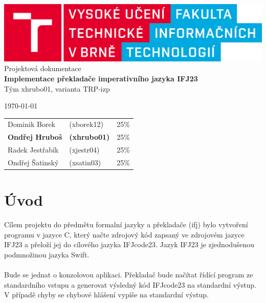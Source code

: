 \documentclass[12pt]{article}
\begin{document}
    \begin{titlepage}
        \begin{center}
            \includegraphics[width=0.77\linewidth]{img/fit_logo.png} \\
            \Huge{Projektová dokumentace} \\
            \Large{\textbf{Implementace překladače imperativního jazyka IFJ23}} \\
            \Large{Tým xhrubo01, varianta TRP-izp} \\ 
        \end{center}
        \begin{minipage}{0.4 \textwidth}
			{\Large \today}
		\end{minipage}
		\hfill
		\begin{minipage}[r]{0.6 \textwidth}
			\normalsize
            \begin{flushright}
                \begin{tabular}{l l l}
    				Dominik Borek & (xborek12) & 25\%\\
    				\textbf{Ondřej Hruboš} & \textbf{(xhrubo01)} & 25\%\\
    				Radek Jestřabík & (xjestr04)  & 25\%\\
    				Ondřej Šatinský & (xsatin03)  & 25\%\\
    			\end{tabular}
            \end{flushright}
		\end{minipage}
      \newpage
    \end{titlepage}

\begin{center}
\renewcommand{\contentsname}{Obsah}
    \tableofcontents
    \clearpage
\end{center}
 
\section{Úvod}
Cílem projektu do předmětu formalní jazyky a překladače (ifj) bylo vytvoření programu v jazyce C, který načte zdrojový kód zapsaný ve zdrojovém jazyce IFJ23 a přeloží jej do cílového jazyka IFJcode23. Jazyk IFJ23 je zjednodušenou podmnožinou jazyka Swift. 
\\  \\
Bude se jednat o konzolovou aplikaci. Překladač bude načítat řídící program ze standardního vstupu a generovat výsledný kód IFJcode23 na standardní výstup. V případě chyby se chybové hlášení vypíše na standardní výstup.
\end{document}
